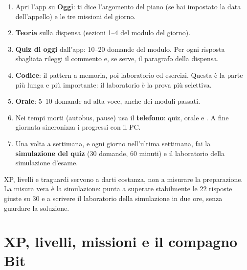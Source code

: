 \begin{passopasso}
\begin{enumerate}
  \item Apri l'app su \textbf{Oggi}: ti dice l'argomento del piano (se hai impostato la
        data dell'appello) e le tre missioni del giorno.
  \item \textbf{Teoria} sulla dispensa (sezioni 1--4 del modulo del giorno).
  \item \textbf{Quiz di oggi} dall'app: 10--20 domande del modulo. Per ogni risposta
        sbagliata rileggi il commento e, se serve, il paragrafo della dispensa.
  \item \textbf{Codice}: il pattern a memoria, poi laboratorio ed esercizi. Questa è la
        parte più lunga e più importante: il laboratorio è la prova più selettiva.
  \item \textbf{Orale}: 5--10 domande ad alta voce, anche dei moduli passati.
  \item Nei tempi morti (autobus, pause) usa il \textbf{telefono}: quiz, orale e
        . A fine giornata sincronizza i progressi con il PC.
  \item Una volta a settimana, e ogni giorno nell'ultima settimana, fai la
        \textbf{simulazione del quiz} (30 domande, 60 minuti) e il laboratorio della
        simulazione d'esame.
\end{enumerate}
\end{passopasso}

\begin{trappola}
XP, livelli e traguardi servono a darti costanza, non a misurare la preparazione. La
misura vera è la simulazione: punta a superare stabilmente le 22 risposte giuste su 30 e
a scrivere il laboratorio della simulazione in due ore, senza guardare la soluzione.
\end{trappola}

\section*{XP, livelli, missioni e il compagno Bit}

